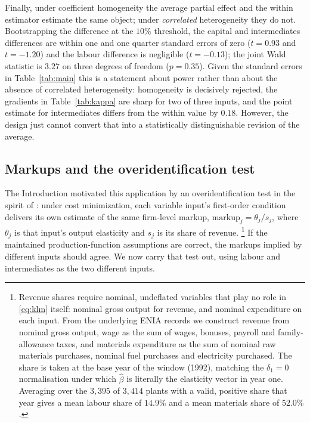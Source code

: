 \documentclass{article}
\begin{document}
Finally, under coefficient homogeneity the average partial effect and the
within estimator estimate the same object; under \emph{correlated}
heterogeneity they do not. Bootstrapping the difference at the $10\%$
threshold, the capital and intermediates differences are within one and one
quarter standard errors of zero ($t=0.93$ and $t=-1.20$) and the labour
difference is negligible ($t=-0.13$); the joint Wald statistic is $3.27$ on
three degrees of freedom ($p = 0.35$). Given the standard errors in
Table~\ref{tab:main} this is a statement about power rather than about the
absence of correlated heterogeneity: homogeneity is decisively rejected, the
gradients in Table~\ref{tab:kappa} are sharp for two of three inputs, and the
point estimate for intermediates differs from the within value by $0.18$. However,
the design just cannot convert that into a statistically distinguishable revision
of the average.

\subsection{Markups and the overidentification test}
\label{sec:markup}

The Introduction motivated this application by an overidentification test in the spirit of \citet{Raval2023}: under cost minimization, each variable input's first-order condition delivers its own estimate of the same firm-level markup, $\text{markup}_j = \theta_j / s_j$, where $\theta_j$ is that input's output elasticity and $s_j$ is its share of revenue. \footnote{Revenue shares require nominal, undeflated variables that play no role in \eqref{eq:klm} itself: nominal gross output for revenue, and nominal expenditure on each input. From the underlying ENIA records we construct revenue from nominal gross output, wage as the sum of wages, bonuses, payroll and family-allowance taxes, and materials expenditure as the sum of nominal raw materials purchases, nominal fuel purchases and electricity purchased. The share is taken at the base year of the window (1992), matching the $\delta_1=0$ normalisation under which $\hat\beta$ is literally the elasticity vector in year one. Averaging over the $3{,}395$ of $3{,}414$ plants with a valid, positive share that year gives a mean labour share of $14.9\%$ and a mean materials share of $52.0\%$.} If the maintained production-function assumptions are correct, the markups implied by different inputs should agree. We now carry that test out, using labour and intermediates as the two different inputs.
\end{document}
